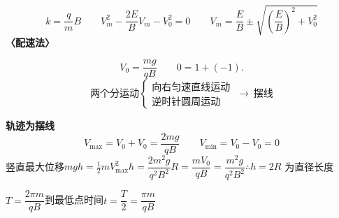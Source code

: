 \[ k=\frac{q}{m}B\qquad V_m^2-\frac{2E}{B}V_m-V_0^2=0\qquad V_m=\frac{E}{B}\pm\sqrt{\left(\frac{E}{B}\right)^2+V_0^2} \]
\textbf{〈配速法〉}

\[ V_0=\frac{mg}{qB}\qquad 0=1+(-1). \]
\[ \text{两个分运动}\left\{\begin{array}{l}\text{向右匀速直线运动}\\ \text{逆时针圆周运动}\end{array}\right.\ \to\ \text{摆线} \]

\textbf{轨迹为摆线}
\[ V_{\max}=V_0+V_0=\frac{2mg}{qB}\qquad V_{\min}=V_0-V_0=0 \]
竖直最大位移\quad$mgh=\tfrac12mV_{\max}^2$\quad$h=\dfrac{2m^2g}{q^2B^2}$\quad$R=\dfrac{mV_0}{qB}=\dfrac{m^2g}{q^2B^2}$\quad$\therefore h=2R$ 为直径长度

$T=\dfrac{2\pi m}{qB}$\quad 到最低点时间\quad$t=\dfrac{T}{2}=\dfrac{\pi m}{qB}$

